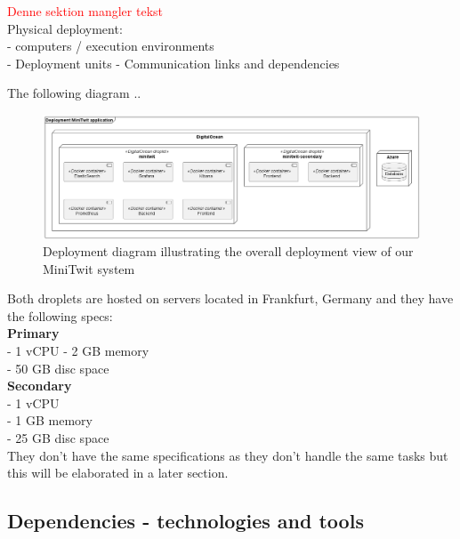 \textcolor{red}{Denne sektion mangler tekst} \\
Physical deployment: \\
- computers / execution environments \\
- Deployment units
- Communication links and dependencies

The following diagram .. 
\begin{figure}[H]
 \centering
 \includegraphics[width = \textwidth]{images/deployment.png}
 \caption{Deployment diagram illustrating the overall deployment view of our MiniTwit system}
 \label{fig:DeploymentDiagram}
\end{figure}

\noindent
Both droplets are hosted on servers located in Frankfurt, Germany and they have the following specs: \\
\textbf{Primary} \\
- 1 vCPU
- 2 GB memory \\
- 50 GB disc space \\

\noindent
\textbf{Secondary} \\
- 1 vCPU \\
- 1 GB memory \\
- 25 GB disc space \\

They don't have the same specifications as they don't handle the same tasks but this will be elaborated in a later section.


\newpage
\subsection{Dependencies - technologies and tools}

